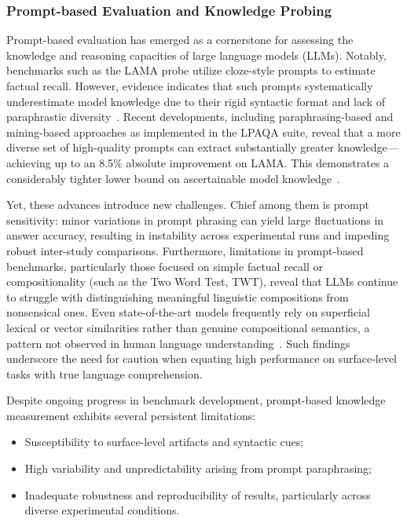 \documentclass[sigconf]{acmart}
\begin{document}
\subsubsection{Prompt-based Evaluation and Knowledge Probing}

Prompt-based evaluation has emerged as a cornerstone for assessing the knowledge and reasoning capacities of large language models (LLMs). Notably, benchmarks such as the LAMA probe utilize cloze-style prompts to estimate factual recall. However, evidence indicates that such prompts systematically underestimate model knowledge due to their rigid syntactic format and lack of paraphrastic diversity~\cite{ref98}. Recent developments, including paraphrasing-based and mining-based approaches as implemented in the LPAQA suite, reveal that a more diverse set of high-quality prompts can extract substantially greater knowledge---achieving up to an 8.5\% absolute improvement on LAMA. This demonstrates a considerably tighter lower bound on ascertainable model knowledge~\cite{ref98}.

Yet, these advances introduce new challenges. Chief among them is prompt sensitivity: minor variations in prompt phrasing can yield large fluctuations in answer accuracy, resulting in instability across experimental runs and impeding robust inter-study comparisons. Furthermore, limitations in prompt-based benchmarks, particularly those focused on simple factual recall or compositionality (such as the Two Word Test, TWT), reveal that LLMs continue to struggle with distinguishing meaningful linguistic compositions from nonsensical ones. Even state-of-the-art models frequently rely on superficial lexical or vector similarities rather than genuine compositional semantics, a pattern not observed in human language understanding~\cite{ref96}. Such findings underscore the need for caution when equating high performance on surface-level tasks with true language comprehension.

Despite ongoing progress in benchmark development, prompt-based knowledge measurement exhibits several persistent limitations:

\begin{itemize}
    \item Susceptibility to surface-level artifacts and syntactic cues;
    \item High variability and unpredictability arising from prompt paraphrasing;
    \item Inadequate robustness and reproducibility of results, particularly across diverse experimental conditions.
\end{itemize}
\end{document}
